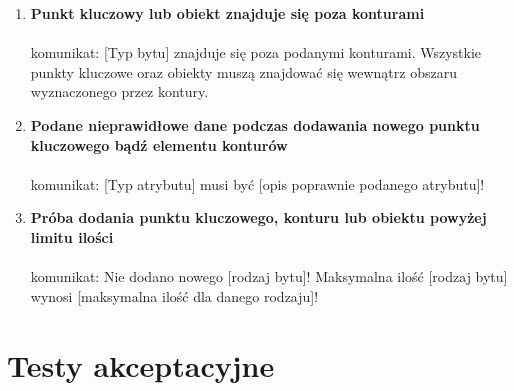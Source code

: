 \documentclass[hidelinks,10pt,a4paper]{article}
\begin{document}
\begin{enumerate}

\item \textbf{Punkt kluczowy lub obiekt znajduje się poza konturami}
\\\\komunikat: [Typ bytu] znajduje się poza podanymi konturami. Wszystkie punkty kluczowe oraz obiekty muszą znajdować się wewnątrz obszaru wyznaczonego przez kontury.

\item \textbf{Podane nieprawidłowe dane podczas dodawania nowego punktu kluczowego bądź elementu konturów}
\\\\komunikat: [Typ atrybutu] musi być [opis poprawnie podanego atrybutu]!

\item \textbf{Próba dodania punktu kluczowego, konturu lub obiektu powyżej limitu ilości}
\\\\komunikat: Nie dodano nowego [rodzaj bytu]! Maksymalna ilość [rodzaj bytu] wynosi [maksymalna ilość dla danego rodzaju]!

\end{enumerate}

\section{Testy akceptacyjne}
\end{document}

